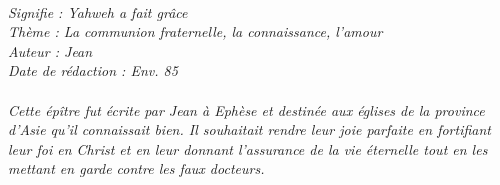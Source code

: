 \BFont
\noindent\hrulefill
{\footnotesize
\textit{
\bigskip
{\centering{}
\\Signifie : Yahweh a fait grâce
\\Thème : La communion fraternelle, la connaissance, l'amour
\\Auteur : Jean
\\Date de rédaction : Env. 85\\}
}
\textit{
\\Cette épître fut écrite par Jean à Ephèse et destinée aux églises de la province d’Asie qu’il connaissait bien. Il souhaitait rendre leur joie parfaite en fortifiant leur foi en Christ et en leur donnant l’assurance de la vie éternelle tout en les mettant en garde contre les faux docteurs.\bigskip
}
}
\par\nobreak\noindent\hrulefill
